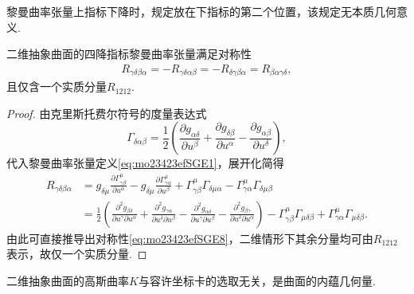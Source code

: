 \documentclass[../../main.tex]{subfiles}%
\begin{document}
\begin{remark}
黎曼曲率张量上指标下降时，规定放在下指标的第二个位置，该规定无本质几何意义.
\end{remark}

\begin{proposition}
二维抽象曲面的四降指标黎曼曲率张量满足对称性
\begin{align}
R_{\gamma\delta\beta\alpha}=-R_{\gamma\delta\alpha\beta}=-R_{\delta\gamma\beta\alpha}=R_{\beta\alpha\gamma\delta},
\label{eq:mo23423efSGE8}
\end{align}
且仅含一个实质分量$R_{1212}$.
\end{proposition}

\begin{proof}
由克里斯托费尔符号的度量表达式
$$\Gamma_{\delta\alpha\beta}=\frac12\left(\frac{\partial g_{\alpha\delta}}{\partial u^\beta}+\frac{\partial g_{\delta\beta}}{\partial u^\alpha}-\frac{\partial g_{\alpha\beta}}{\partial u^\delta}\right),$$
代入黎曼曲率张量定义\eqref{eq:mo23423efSGE1}，展开化简得
\begin{align}
R_{\gamma\delta\beta\alpha}&=g_{\delta\mu}\frac{\partial\Gamma^\mu_{\gamma\beta}}{\partial u^\alpha}-g_{\delta\mu}\frac{\partial\Gamma^\mu_{\gamma\alpha}}{\partial u^\beta}+\Gamma^\mu_{\gamma\beta}\Gamma_{\delta\mu\alpha}-\Gamma^\mu_{\gamma\alpha}\Gamma_{\delta\mu\beta}\nonumber\\
&=\frac12\left(\frac{\partial^2 g_{\beta\delta}}{\partial u^\gamma\partial u^\alpha}+\frac{\partial^2 g_{\gamma\alpha}}{\partial u^\delta\partial u^\beta}-\frac{\partial^2 g_{\alpha\delta}}{\partial u^\gamma\partial u^\beta}-\frac{\partial^2 g_{\beta\gamma}}{\partial u^\delta\partial u^\alpha}\right)-\Gamma^\mu_{\gamma\beta}\Gamma_{\mu\delta\beta}+\Gamma^\mu_{\gamma\alpha}\Gamma_{\mu\delta\beta}.
\label{eq:mo23423efSGE7}
\end{align}
由此可直接推导出对称性\eqref{eq:mo23423efSGE8}，二维情形下其余分量均可由$R_{1212}$表示，故仅一个实质分量.
\end{proof}

\begin{theorem}
二维抽象曲面的高斯曲率$K$与容许坐标卡的选取无关，是曲面的内蕴几何量.
\end{theorem}
\end{document}
